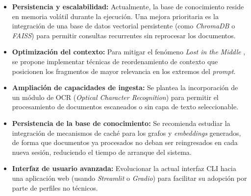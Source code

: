 \begin{itemize}
    \item \textbf{Persistencia y escalabilidad:} Actualmente, la base de conocimiento reside en memoria volátil durante la ejecución. Una mejora prioritaria es la integración de una base de datos vectorial persistente (como \textit{ChromaDB} o \textit{FAISS}) para permitir consultas recurrentes sin reprocesar los documentos.
    \item \textbf{Optimización del contexto:} Para mitigar el fenómeno \textit{Lost in the Middle} \cite{liu2024lost}, se propone implementar técnicas de reordenamiento de contexto que posicionen los fragmentos de mayor relevancia en los extremos del \textit{prompt}.
    \item \textbf{Ampliación de capacidades de ingesta:} Se plantea la incorporación de un módulo de OCR (\textit{Optical Character Recognition}) para permitir el procesamiento de documentos escaneados o sin capa de texto seleccionable.
    \item \textbf{Persistencia de la base de conocimiento:} Se recomienda estudiar la integración de mecanismos de caché para los grafos y \textit{embeddings} generados, de forma que documentos ya procesados no deban ser reingresados en cada nueva sesión, reduciendo el tiempo de arranque del sistema.
    \item \textbf{Interfaz de usuario avanzada:} Evolucionar la actual interfaz CLI hacia una aplicación web (usando \textit{Streamlit} o \textit{Gradio}) para facilitar su adopción por parte de perfiles no técnicos.
\end{itemize}
